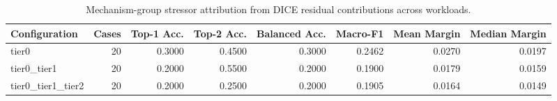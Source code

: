 \begin{table}[t]
\centering
\caption{Mechanism-group stressor attribution from DICE residual contributions across workloads.}
\label{tab:dice_stressor_diagnosis}
\footnotesize
\begin{tabular}{lrrrrrrr}
\toprule
Configuration & Cases & Top-1 Acc. & Top-2 Acc. & Balanced Acc. & Macro-F1 & Mean Margin & Median Margin \\
\midrule
tier0 & 20 & 0.3000 & 0.4500 & 0.3000 & 0.2462 & 0.0270 & 0.0197 \\
tier0_tier1 & 20 & 0.2000 & 0.5500 & 0.2000 & 0.1900 & 0.0179 & 0.0159 \\
tier0_tier1_tier2 & 20 & 0.2000 & 0.2500 & 0.2000 & 0.1905 & 0.0164 & 0.0149 \\
\bottomrule
\end{tabular}

\end{table}
